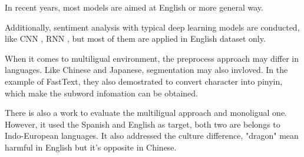 In recent years, most models are aimed at English or more general way. 

Additionally, sentiment analysis with typical deep learning models are conducted, like CNN 
\cite{kim2014convolutional}, RNN \cite{arevian2007recurrent}, but most of them are applied in English dataset only. 

When it comes to multiligual environment, the preprocess approach may differ in languages. Like Chinese and Japanese, segmentation may also invloved.
In the example of FastText\cite{joulin2016fasttext}, they also demostrated to convert character into pinyin, which make the subword infomation can be obtained. 

There is also a work\cite{multilingual} to evaluate the multiligual approach and monoligual one. However, it used the Spanish and English as target, both two are belongs 
to Indo-European languages. It also addressed the culture difference, "dragon" mean harmful in English but it's opposite in Chinese. 

